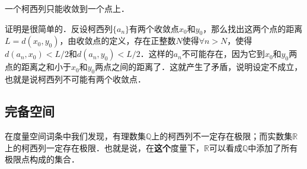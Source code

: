 一个柯西列只能收敛到一个点上．

\begin{theorem}{收敛点的唯一性}

给定度量空间$\mathcal{M}$，如果$\{a_n\}_{n=1}^{\infty$是一个柯西列，那么这个柯西列只收敛到一个点上．

\end{theorem}

证明是很简单的．反设柯西列$\{a_n\}$有两个收敛点$x_0$和$y_0$，那么找出这两个点的距离$L=d(x_0, y_0)$，由收敛点的定义，存在正整数$N$使得$\forall n>N$，使得$d(a_n, x_0)<L/2$和$d(a_n, y_0)<L/2$．这样的$a_n$不可能存在，因为它到$x_0$和$y_0$两点的距离之和小于$x_0$和$y_0$两点之间的距离了．这就产生了矛盾，说明设定不成立，也就是说柯西列不可能有两个收敛点．


\subsection{完备空间}

在度量空间词条中我们发现，有理数集$\mathbb{Q}$上的柯西列不一定存在极限；而实数集$\mathbb{R}$上的柯西列一定存在极限．也就是说，在\textbf{这个}度量下，$\mathbb{R}$可以看成$\mathbb{Q}$中添加了所有极限点构成的集合．